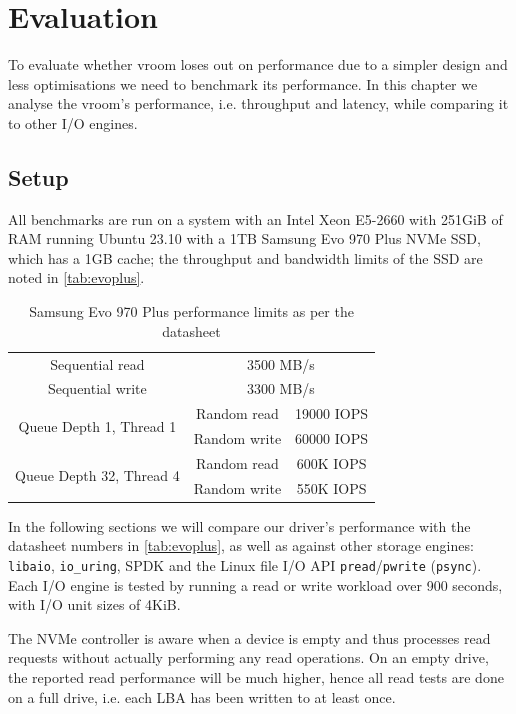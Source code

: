\chapter{Evaluation}\label{chapter:eval}
To evaluate whether vroom loses out on performance due to a simpler design and less optimisations we need to benchmark its performance. In this chapter we analyse the vroom's performance, i.e. throughput and latency, while comparing it to other I/O engines.

\section{Setup}
All benchmarks are run on a system with an Intel Xeon E5-2660 with 251GiB of RAM running Ubuntu 23.10 with a 1TB Samsung Evo 970 Plus NVMe SSD, which has a 1GB cache; the throughput and bandwidth limits of the SSD are noted in \autoref{tab:evoplus}.

\begin{table}
    \centering
    \begin{tabular} { ||c|c|c|| }
        \cline{1-3}
        Sequential read & \multicolumn{2}{|c||}{3500 MB/s} \\ \cline{1-3}
        Sequential write & \multicolumn{2}{|c||}{3300 MB/s} \\ \cline{1-3}
        \multirow{2}{*}{Queue Depth 1, Thread 1} & Random read & 19000 IOPS \\ \cline{2-3}
                                                    & Random write & 60000 IOPS \\ \cline{1-3}
        \multirow{2}{*}{Queue Depth 32, Thread 4} & Random read & 600K IOPS \\ \cline{2-3}
                                                    & Random write & 550K IOPS \\ \cline{1-3}
    \end{tabular}
    \caption{Samsung Evo 970 Plus performance limits as per the datasheet}
    \label{tab:evoplus}
\end{table}

In the following sections we will compare our driver's performance with the datasheet numbers in \autoref{tab:evoplus}, as well as against other storage engines: \texttt{libaio}, \texttt{io\_uring}, SPDK and the Linux file I/O API \texttt{pread}/\texttt{pwrite} (\texttt{psync}). Each I/O engine is tested by running a read or write workload over 900 seconds, with I/O unit sizes of 4KiB.

The NVMe controller is aware when a device is empty and thus processes read requests without actually performing any read operations. On an empty drive, the reported read performance will be much higher, hence all read tests are done on a full drive, i.e. each LBA has been written to at least once.

